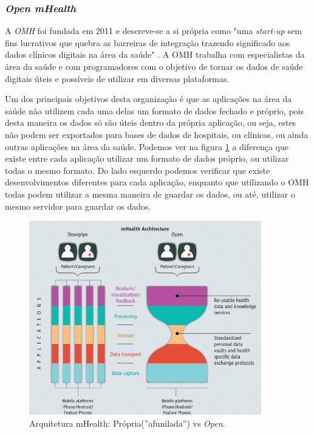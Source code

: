 \subsubsection{\textit{Open mHealth}}
A \textit{\gls{OMH}} foi fundada em 2011 e descreve-se a si própria como "uma \textit{start-up} sem fins lucrativos que quebra as barreiras de integração trazendo significado aos dados clínicos digitais na área da saúde" \cite{omhabout}. A \gls{OMH} trabalha com especialistas da área da saúde e com programadores com o objetivo de tornar os dados de saúde digitais úteis e possíveis de utilizar em diversas plataformas. \par 
Um dos principais objetivos desta organização é que as aplicações na área da saúde não utilizem cada uma delas um formato de dados fechado e próprio, pois desta maneira os dados só são úteis dentro da própria aplicação, ou seja, estes não podem ser exportados para bases de dados de hospitais, ou clínicas, ou ainda outras aplicações na área da saúde. Podemos ver na figura \ref{f:omharch} a diferença que existe entre cada aplicação utilizar um formato de dados próprio, ou utilizar todas o mesmo formato\cite{omharticle}. Do lado esquerdo podemos verificar que existe desenvolvimentos diferentes para cada aplicação, enquanto que utilizando o \gls{OMH} todas podem utilizar a mesma maneira de guardar os dados, ou até, utilizar o mesmo servidor para guardar os dados.
\begin{figure}[H]
  \centering
  \includegraphics[width=0.9\textwidth]{imgs/openmharch.png}
  \caption[Arquitetura mHealth: Própria(''afunilada'') vs \textit{Open}]{Arquitetura mHealth: Própria(''afunilada'') vs \textit{Open}. \cite{omharticle}}
  
  \label{f:omharch}
\end{figure}

